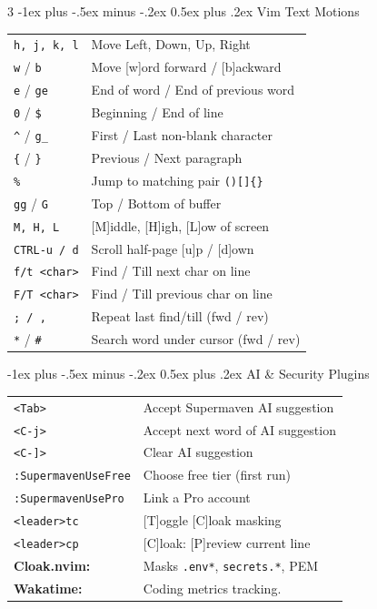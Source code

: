 \documentclass[11pt,landscape]{article}
\makeatletter
\renewcommand{\section}{\@startsection{section}{1}{0mm}%
                                {-1ex plus -.5ex minus -.2ex}%
                                {0.5ex plus .2ex}%
                                {\normalfont\large\bfseries\color{myblue}}}
\makeatother
\begin{document}
\begin{multicols}{3}
\section{Vim Text Motions}
\begin{tabular}{@{}ll@{}}
\texttt{h, j, k, l} & Move Left, Down, Up, Right \\
\texttt{w} / \texttt{b} & Move [w]ord forward / [b]ackward \\
\texttt{e} / \texttt{ge} & End of word / End of previous word \\
\texttt{0} / \texttt{\$} & Beginning / End of line \\
\texttt{\^{}} / \texttt{g\_} & First / Last non-blank character \\
\texttt{\{} / \texttt{\}} & Previous / Next paragraph \\
\texttt{\%} & Jump to matching pair \texttt{()[]\{\}} \\
\texttt{gg} / \texttt{G} & Top / Bottom of buffer \\
\texttt{M, H, L} & [M]iddle, [H]igh, [L]ow of screen \\
\texttt{CTRL-u / d} & Scroll half-page [u]p / [d]own \\
\texttt{f/t <char>} & Find / Till next char on line \\
\texttt{F/T <char>} & Find / Till previous char on line \\
\texttt{; / ,} & Repeat last find/till (fwd / rev) \\
\texttt{*} / \texttt{\#} & Search word under cursor (fwd / rev) \\
\end{tabular}

\section{AI \& Security Plugins}
\begin{tabular}{@{}ll@{}}
\texttt{<Tab>} & Accept Supermaven AI suggestion \\
\texttt{<C-j>} & Accept next word of AI suggestion \\
\texttt{<C-]>} & Clear AI suggestion \\
\texttt{:SupermavenUseFree} & Choose free tier (first run) \\
\texttt{:SupermavenUsePro} & Link a Pro account \\
\hline
\texttt{<leader>tc} & [T]oggle [C]loak masking \\
\texttt{<leader>cp} & [C]loak: [P]review current line \\
\textbf{Cloak.nvim:} & Masks \texttt{.env*}, \texttt{secrets.*}, PEM \\
\textbf{Wakatime:} & Coding metrics tracking. \\
\end{tabular}


\end{multicols}
\end{document}
